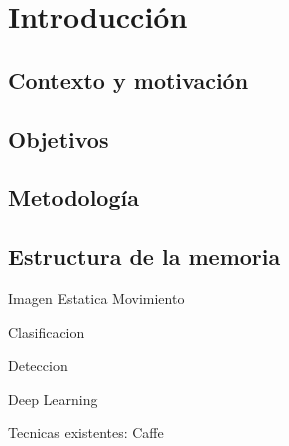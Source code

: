 \chapter{Introducción}\label{cap.introduccion}
\section{Contexto y motivación}
\section{Objetivos}
\section{Metodología}
\section{Estructura de la memoria}

Imagen
	Estatica
	Movimiento
	
Clasificacion
	
Deteccion

Deep Learning

Tecnicas existentes: Caffe